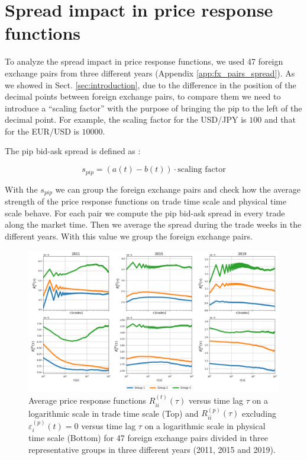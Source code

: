 \section{Spread impact in price response functions}\label{sec:spread_impact}

To analyze the spread impact in price response functions, we used 47 foreign
exchange pairs from three different years (Appendix \ref{app:fx_pairs_spread}).
As we showed in Sect. \ref{sec:introduction}, due to the difference in the
position of the decimal points between foreign exchange pairs, to compare them
we need to introduce a ``scaling factor'' with the purpose of bringing the pip
to the left of the decimal point. For example, the scaling factor for the
USD/JPY is $100$ and that for the EUR/USD is $10000$.

The pip bid-ask spread is defined as \cite{micro_eff}:

\begin{equation}
    s_{pip} = \left(a\left(t\right) - b\left(t\right)\right) \cdot
    \text{scaling factor}
\end{equation}

With the $s_{pip}$ we can group the foreign exchange pairs and check how the
average strength of the price response functions on trade time scale and
physical time scale behave. For each pair we compute the pip bid-ask spread in
every trade along the market time. Then we average the spread during the trade
weeks in the different years. With this value we group the foreign exchange
pairs.

\begin{figure}[htbp]
    \centering
    \includegraphics[width=\textwidth]{figures/05_spread_impact.png}
    \caption{Average price response functions
             $R^{\left(t\right)}_{ii}\left(\tau\right)$ versus time lag $\tau$
             on a logarithmic scale in trade time scale (Top) and
             $R^{\left(p\right)}_{ii}\left(\tau\right)$ excluding
             $\varepsilon^{\left(p\right)}_{i}\left(t\right) = 0$ versus time
             lag $\tau$ on a logarithmic scale in physical time scale (Bottom)
             for 47 foreign exchange pairs divided in three representative
             groups in three different years (2011, 2015 and 2019).}
    \label{fig:spread_impact}
\end{figure}

